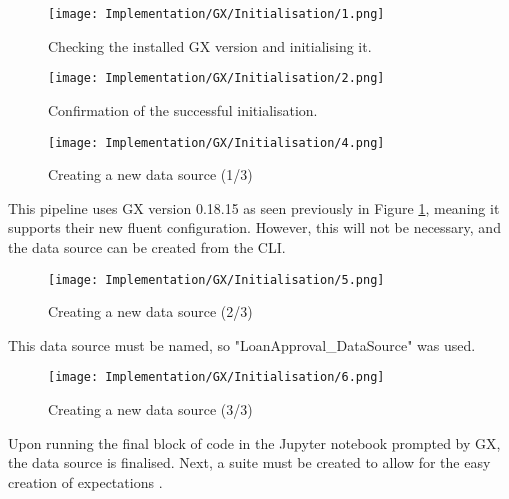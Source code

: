 \begin{figure}[H]
    \centering
    \texttt{[image: Implementation/GX/Initialisation/1.png]}
    \caption{Checking the installed GX version and initialising it.}
    \label{fig:GXVersion}
\end{figure}

\begin{figure}[H]
    \centering
    \texttt{[image: Implementation/GX/Initialisation/2.png]}
    \caption{Confirmation of the successful initialisation.}
    \label{fig:GXInitConfirm}
\end{figure}


\begin{figure}[H]
    \centering
    \texttt{[image: Implementation/GX/Initialisation/4.png]}
    \caption{Creating a new data source (1/3)}
    \label{fig:GXDatasource1}
\end{figure}

\para This pipeline uses GX version 0.18.15 as seen previously in Figure \ref{fig:GXVersion},
meaning it supports their new fluent configuration. However, this will not be necessary,
and the data source can be created from the CLI.

\begin{figure}[H]
    \centering
    \texttt{[image: Implementation/GX/Initialisation/5.png]}
    \caption{Creating a new data source (2/3)}
    \label{fig:GXDatasource2}
\end{figure}

\para This data source must be named, so "LoanApproval\_DataSource" was used.

\begin{figure}[H]
    \centering
    \texttt{[image: Implementation/GX/Initialisation/6.png]}
    \caption{Creating a new data source (3/3)}
    \label{fig:GXDatasource3}
\end{figure}

\para Upon running the final block of code in the Jupyter notebook prompted by 
GX, the data source is finalised. Next, a suite must be created to allow for the easy creation of expectations \autocite{gx_expectation_nodate}.


